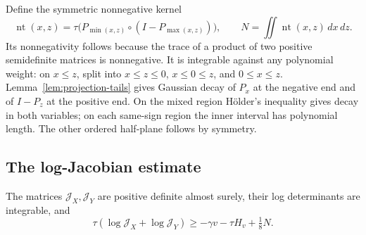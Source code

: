 Define the symmetric nonnegative kernel
\[
 \operatorname{nt}(x,z)
 =\tau\bigl(P_{\min(x,z)}\circ(I-P_{\max(x,z)})\bigr),
 \qquad
 N=\iint\operatorname{nt}(x,z)\,dx\,dz.
\]
Its nonnegativity follows because the trace of a product of two
positive semidefinite matrices is nonnegative. It is integrable
against any polynomial weight: on $x\le z$, split into
$x\le z\le0$, $x\le0\le z$, and $0\le x\le z$.
Lemma~\ref{lem:projection-tails} gives Gaussian decay of $P_x$
at the negative end and of $I-P_z$ at the positive end.
On the mixed region H\"older's inequality gives decay in both
variables; on each same-sign region the inner interval has
polynomial length. The other ordered half-plane follows by symmetry.

\subsection{The log-Jacobian estimate}
\begin{lemma}\label{lem:log-jacobian}
The matrices \(\mathcal J_X,\mathcal J_Y\) are positive definite almost surely, their log determinants are integrable, and
\[
\tau(\log\mathcal J_X+\log\mathcal J_Y)
\ge-\gamma v-\tau H_v+\tfrac18N.
\tag{9}\label{eq:11}
\]
\end{lemma}
